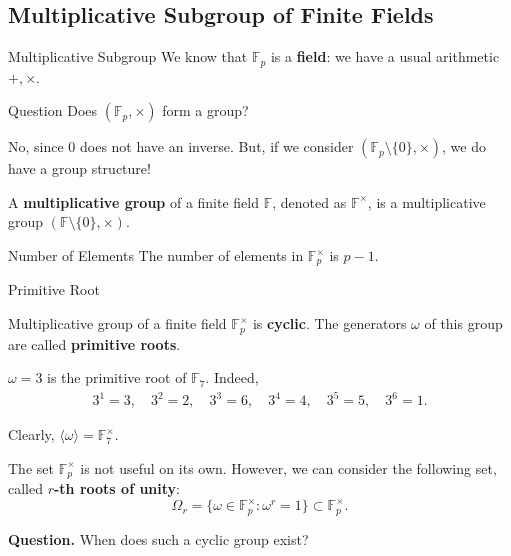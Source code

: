 \documentclass{zkdl-presentation-template}
\begin{document}
    \subsection{Multiplicative Subgroup of Finite Fields}
    \begin{frame}{Multiplicative Subgroup}
        We know that $\mathbb{F}_p$ is a \textbf{field}: we have a usual arithmetic $+,\times$.
        \pause

        \begin{questionblock}{Question}
            Does $(\mathbb{F}_p, \times)$ form a group?
        \end{questionblock}
        \pause

        No, since $0$ does not have an inverse. But, if we consider
        $(\mathbb{F}_p \setminus \{0\}, \times)$, we do have a group structure!
        \pause

        \begin{definition}
            A \textbf{multiplicative group} of a finite field $\mathbb{F}$, denoted as $\mathbb{F}^{\times}$, is a multiplicative group $(\mathbb{F} \setminus \{0\}, \times)$.
        \end{definition}
        \pause

        \begin{remarkblock}{Number of Elements}
            The number of elements in $\mathbb{F}^{\times}_p$ is $p - 1$.
        \end{remarkblock}
    \end{frame}

    \begin{frame}{Primitive Root}
        \begin{theorem}
            Multiplicative group of a finite field $\mathbb{F}^{\times}_p$ is
            \textbf{cyclic}. The generators $\omega$ of this group are called
            \textbf{primitive roots}.
        \end{theorem}
        \pause

        \begin{example}
            $\omega=3$ is the primitive root of $\mathbb{F}_7$. Indeed,
            \begin{align*}
                3^1 = 3, \quad 3^2 = 2, \quad 3^3 = 6, \quad 3^4 = 4, \quad 3^5 = 5, \quad 3^6 = 1.
            \end{align*}

            Clearly, $\langle \omega \rangle = \mathbb{F}_7^{\times}$.
        \end{example}
        \pause

        The set $\mathbb{F}^{\times}_p$ is not useful on its own. However, we
        can consider the following set, called \textbf{$r$-th roots of unity}:
        \begin{equation*}
            \Omega_r = \{ \omega \in \mathbb{F}^{\times}_p : \omega^r = 1 \} \subset \mathbb{F}_p^{\times}.
        \end{equation*}

        \vspace{-15px}
        \pause

        \textcolor{oc-pink-7}{\textbf{Question.}} When does such a cyclic group exist?
    \end{frame}
\end{document}
